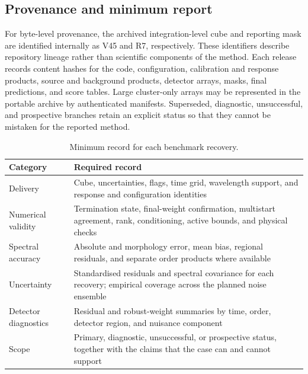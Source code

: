 \subsection{Provenance and minimum report}

For byte-level provenance, the archived integration-level cube and reporting
mask are identified internally as V45 and R7, respectively. These identifiers
describe repository lineage rather than scientific components of the method.
Each release records content hashes for the code, configuration, calibration
and response products, source and background products, detector arrays, masks,
final predictions, and score tables. Large cluster-only arrays may be
represented in the portable archive by authenticated manifests. Superseded,
diagnostic, unsuccessful, and prospective branches retain an explicit status
so that they cannot be mistaken for the reported method.

\begin{table}[t]
 \centering
 \footnotesize
 \caption{Minimum record for each benchmark recovery.}
 \label{tab:benchmark-report}
 \setlength{\tabcolsep}{3pt}
 \begin{tabularx}{0.97\columnwidth}{@{}>{\raggedright\arraybackslash}p{}>{\raggedright\arraybackslash}X@{}}
  \toprule
  Category & Required record \\
  \midrule
  Delivery & Cube, uncertainties, flags, time grid, wavelength support, and
  response and configuration identities \\
  Numerical validity & Termination state, final-weight confirmation,
  multistart agreement, rank, conditioning, active bounds, and physical checks \\
  Spectral accuracy & Absolute and morphology error, mean bias, regional
  residuals, and separate order products where available \\
  Uncertainty & Standardised residuals and spectral covariance for each
  recovery; empirical coverage across the planned noise ensemble \\
  Detector diagnostics & Residual and robust-weight summaries by time, order,
  detector region, and nuisance component \\
  Scope & Primary, diagnostic, unsuccessful, or prospective status, together
  with the claims that the case can and cannot support \\
  \bottomrule
 \end{tabularx}
\end{table}
